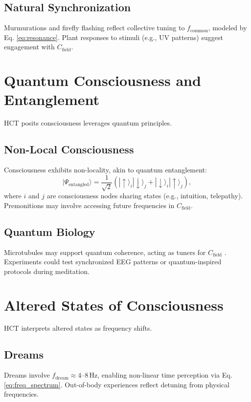 \documentclass[a4paper,12pt]{article}
\begin{document}
\subsection{Natural Synchronization}
Murmurations and firefly flashing reflect collective tuning to $f_{\text{common}}$, modeled by Eq. \ref{eq:resonance}. Plant responses to stimuli (e.g., UV patterns) suggest engagement with $C_{\text{field}}$.

\section{Quantum Consciousness and Entanglement}
\label{sec:quantum}
HCT posits consciousness leverages quantum principles.

\subsection{Non-Local Consciousness}
Consciousness exhibits non-locality, akin to quantum entanglement:
\begin{equation}
|\Psi_{\text{entangled}}\rangle = \frac{1}{\sqrt{2}} (|\uparrow\rangle_i |\downarrow\rangle_j + |\downarrow\rangle_i |\uparrow\rangle_j),
\label{eq:entanglement}
\end{equation}
where $i$ and $j$ are consciousness nodes sharing states (e.g., intuition, telepathy). Premonitions may involve accessing future frequencies in $C_{\text{field}}$.

\subsection{Quantum Biology}
Microtubules may support quantum coherence, acting as tuners for $C_{\text{field}}$ \citep{PenroseHameroff1996}. Experiments could test synchronized EEG patterns or quantum-inspired protocols during meditation.

\section{Altered States of Consciousness}
\label{sec:altered_states}
HCT interprets altered states as frequency shifts.

\subsection{Dreams}
Dreams involve $f_{\text{dream}} \approx 4\text{--}8 \, \text{Hz}$, enabling non-linear time perception via Eq. \ref{eq:freq_spectrum}. Out-of-body experiences reflect detuning from physical frequencies.
\end{document}
